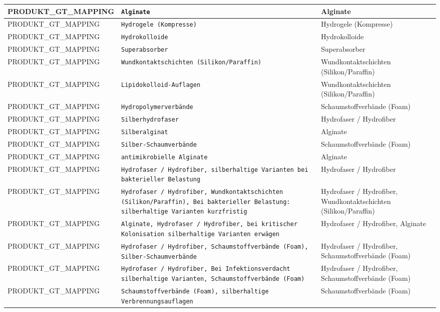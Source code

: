 \begin{longtable}{|p{3.5cm}|p{5cm}|p{6.5cm}|}
PRODUKT\_GT\_MAPPING & \texttt{Alginate} & Alginate \\ \hline
PRODUKT\_GT\_MAPPING & \texttt{Hydrogele (Kompresse)} & Hydrogele (Kompresse) \\ \hline
PRODUKT\_GT\_MAPPING & \texttt{Hydrokolloide} & Hydrokolloide \\ \hline
PRODUKT\_GT\_MAPPING & \texttt{Superabsorber} & Superabsorber \\ \hline
PRODUKT\_GT\_MAPPING & \texttt{Wundkontaktschichten (Silikon/Paraffin)} & Wundkontaktschichten (Silikon/Paraffin) \\ \hline
PRODUKT\_GT\_MAPPING & \texttt{Lipidokolloid-Auflagen} & Wundkontaktschichten (Silikon/Paraffin) \\ \hline
PRODUKT\_GT\_MAPPING & \texttt{Hydropolymerverbände} & Schaumstoffverbände (Foam) \\ \hline
PRODUKT\_GT\_MAPPING & \texttt{Silberhydrofaser} & Hydrofaser / Hydrofiber \\ \hline
PRODUKT\_GT\_MAPPING & \texttt{Silberalginat} & Alginate \\ \hline
PRODUKT\_GT\_MAPPING & \texttt{Silber-Schaumverbände} & Schaumstoffverbände (Foam) \\ \hline
PRODUKT\_GT\_MAPPING & \texttt{antimikrobielle Alginate} & Alginate \\ \hline
PRODUKT\_GT\_MAPPING & \texttt{Hydrofaser / Hydrofiber, silberhaltige Varianten bei bakterieller Belastung} & Hydrofaser / Hydrofiber \\ \hline
PRODUKT\_GT\_MAPPING & \texttt{Hydrofaser / Hydrofiber, Wundkontaktschichten (Silikon/Paraffin), Bei bakterieller Belastung: silberhaltige Varianten kurzfristig} & Hydrofaser / Hydrofiber, Wundkontaktschichten (Silikon/Paraffin) \\ \hline
PRODUKT\_GT\_MAPPING & \texttt{Alginate, Hydrofaser / Hydrofiber, bei kritischer Kolonisation silberhaltige Varianten erwägen} & Hydrofaser / Hydrofiber, Alginate \\ \hline
PRODUKT\_GT\_MAPPING & \texttt{Hydrofaser / Hydrofiber, Schaumstoffverbände (Foam), Silber-Schaumverbände} & Hydrofaser / Hydrofiber, Schaumstoffverbände (Foam) \\ \hline
PRODUKT\_GT\_MAPPING & \texttt{Hydrofaser / Hydrofiber, Bei Infektionsverdacht silberhaltige Varianten, Schaumstoffverbände (Foam)} & Hydrofaser / Hydrofiber, Schaumstoffverbände (Foam) \\ \hline
PRODUKT\_GT\_MAPPING & \texttt{Schaumstoffverbände (Foam), silberhaltige Verbrennungsauflagen} & Schaumstoffverbände (Foam) \\ \hline

\end{longtable}

